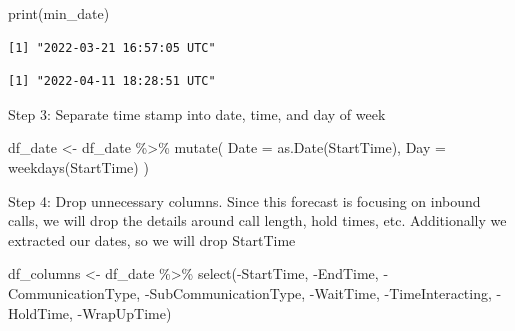\documentclass[
  letterpaper,
  DIV=11,
  numbers=noendperiod]{scrartcl}
\newenvironment{Shaded}{\begin{snugshade}}{\end{snugshade}}
\newcommand{\AttributeTok}[1]{\textcolor[rgb]{0.40,0.45,0.13}{#1}}
\newcommand{\FunctionTok}[1]{\textcolor[rgb]{0.28,0.35,0.67}{#1}}
\newcommand{\NormalTok}[1]{\textcolor[rgb]{0.00,0.23,0.31}{#1}}
\newcommand{\OtherTok}[1]{\textcolor[rgb]{0.00,0.23,0.31}{#1}}
\newcommand{\SpecialCharTok}[1]{\textcolor[rgb]{0.37,0.37,0.37}{#1}}
\newcommand{\StringTok}[1]{\textcolor[rgb]{0.13,0.47,0.30}{#1}}
\begin{document}
\begin{Shaded}
\begin{Highlighting}[]
\FunctionTok{print}\NormalTok{(min\_date)}
\end{Highlighting}
\end{Shaded}

\begin{verbatim}
[1] "2022-03-21 16:57:05 UTC"
\end{verbatim}

\begin{Shaded}
\end{Shaded}

\begin{verbatim}
[1] "2022-04-11 18:28:51 UTC"
\end{verbatim}

Step 3: Separate time stamp into date, time, and day of week

\begin{Shaded}
\begin{Highlighting}[]
\NormalTok{df\_date }\OtherTok{\textless{}{-}}\NormalTok{ df\_date }\SpecialCharTok{\%\textgreater{}\%}
  \FunctionTok{mutate}\NormalTok{(}
    \AttributeTok{Date =} \FunctionTok{as.Date}\NormalTok{(StartTime),}
    \AttributeTok{Day =} \FunctionTok{weekdays}\NormalTok{(StartTime)}
\NormalTok{  )}
\end{Highlighting}
\end{Shaded}

Step 4: Drop unnecessary columns. Since this forecast is focusing on
inbound calls, we will drop the details around call length, hold times,
etc. Additionally we extracted our dates, so we will drop StartTime

\begin{Shaded}
\begin{Highlighting}[]
\NormalTok{df\_columns }\OtherTok{\textless{}{-}}\NormalTok{ df\_date }\SpecialCharTok{\%\textgreater{}\%}
  \FunctionTok{select}\NormalTok{(}\SpecialCharTok{{-}}\NormalTok{StartTime, }\SpecialCharTok{{-}}\NormalTok{EndTime, }\SpecialCharTok{{-}}\NormalTok{CommunicationType, }\SpecialCharTok{{-}}\NormalTok{SubCommunicationType, }\SpecialCharTok{{-}}\NormalTok{WaitTime, }\SpecialCharTok{{-}}\NormalTok{TimeInteracting, }\SpecialCharTok{{-}}\NormalTok{HoldTime, }\SpecialCharTok{{-}}\NormalTok{WrapUpTime)}
\end{Highlighting}
\end{Shaded}
\end{document}
